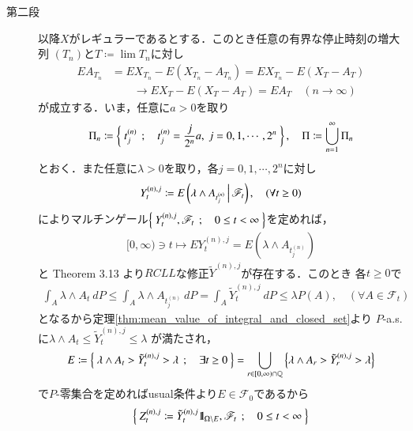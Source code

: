 \begin{prf}
\begin{description}
			\item[第二段]
				以降$X$がレギュラーであるとする．このとき任意の有界な停止時刻の増大列
				$(T_n)$と$T \coloneqq \lim T_n$に対し
				\begin{align}
					EA_{T_n} &= EX_{T_n} - E(X_{T_n} - A_{T_n})
					= EX_{T_n} - E(X_T - A_T) \\
					&\qquad \longrightarrow EX_T - E(X_T - A_T)
					= EA_T
					\quad (n \longrightarrow \infty)
					\label{eq:chapter_1_theorem_3_14_1}
				\end{align}
				が成立する．いま，任意に$a > 0$を取り
				\begin{align}
					\Pi_n \coloneqq 
					\Set{t^{(n)}_j}{t^{(n)}_j = \frac{j}{2^n}a,\ j=0,1,\cdots,2^n},
					\quad \Pi \coloneqq \bigcup_{n=1}^\infty \Pi_n
				\end{align}
				とおく．また任意に$\lambda > 0$を取り，各$j = 0,1,\cdots,2^n$に対し
				\begin{align}
					Y^{(n),j}_t \coloneqq
					E\left( \lambda \wedge A_{t^{(n)}_j} \, \middle|\, \mathscr{F}_t \right),
					\quad (\forall t \geq 0)
				\end{align}
				によりマルチンゲール$\left\{\ Y^{(n),j}_t,\mathscr{F}_t\ \, ; \quad 0 \leq t < \infty\ \right\}$を定めれば，
				\begin{align}
					[0,\infty) \ni t \longmapsto EY^{(n),j}_t 
					= E\left(\lambda \wedge A_{t^{(n)}_j}\right)
				\end{align}
				と Theorem 3.13 より$RCLL$な修正$\tilde{Y}^{(n),j}$が存在する．このとき
				各$t \geq 0$で
				\begin{align}
					\int_A \lambda \wedge A_t\ dP
					\leq \int_A \lambda \wedge A_{t^{(n)}_j}\ dP
					= \int_A \tilde{Y}^{(n),j}_t\ dP 
					\leq \lambda P(A),
					\quad (\forall A \in \mathscr{F}_t)
				\end{align}
				となるから定理\ref{thm:mean_value_of_integral_and_closed_set}より
				$P$-a.s.に$\lambda \wedge A_t \leq \tilde{Y}^{(n),j}_t \leq \lambda$
				が満たされ，
				\begin{align}
					E \coloneqq \left\{\ \lambda \wedge A_t > \tilde{Y}^{(n),j}_t > \lambda\ \, ; \quad \exists t \geq 0\ \right\}
					= \bigcup_{r \in [0,\infty)\cap\mathbb{Q}}\left\{\lambda \wedge A_r > \tilde{Y}^{(n),j}_r > \lambda\right\}
				\end{align}
				で$P$-零集合を定めればusual条件より$E \in \mathscr{F}_0$であるから
				\begin{align}
					\left\{\ Z^{(n),j}_t \coloneqq \tilde{Y}^{(n),j}_t \mbox{1}\hspace{-0.25em}\mbox{l}_{\Omega \backslash E},
					\mathscr{F}_t\ \, ; \quad 0 \leq t < \infty\ \right\}
				\end{align}

\end{description}
\end{prf}
